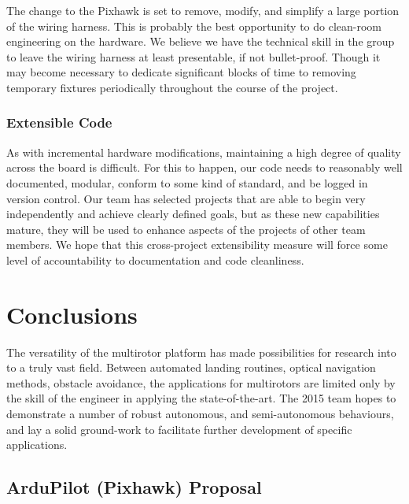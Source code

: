 \documentclass[a4paper, 11pt, titlepage]{article}
\begin{document}
      The change to the Pixhawk is set to remove, modify, and simplify a large portion of the wiring harness.  This is probably the best opportunity to do clean-room engineering on the hardware.  We believe we have the technical skill in the group to leave the wiring harness at least presentable, if not bullet-proof.
      Though it may become necessary to dedicate significant blocks of time to removing temporary fixtures periodically throughout the course of the project.

    \subsubsection{Extensible Code}
      As with incremental hardware modifications, maintaining a high degree of quality across the board is difficult.  
      For this to happen, our code needs to reasonably well documented, modular, conform to some kind of standard, and be logged in version control. 
      Our team has selected projects that are able to begin very independently and achieve clearly defined goals, but as these new capabilities mature, they will be used to enhance aspects of the projects of other team members.  We hope that this cross-project extensibility measure will force some level of accountability to documentation and code cleanliness.
  \section{Conclusions}
    The versatility of the multirotor platform has made possibilities for research into to a truly vast field.  Between automated landing routines, optical navigation methods, obstacle avoidance, the applications for multirotors are limited only by the skill of the engineer in applying the state-of-the-art.
    The 2015 team hopes to demonstrate a number of robust autonomous, and semi-autonomous behaviours, and lay a solid ground-work to facilitate further development of specific applications.


\renewcommand{\refname}{References}


%


\begin{appendices}
  \section{ArduPilot (Pixhawk) Proposal} \label{sec:PihawkProposal}
    

\end{appendices}

	
\end{document}

